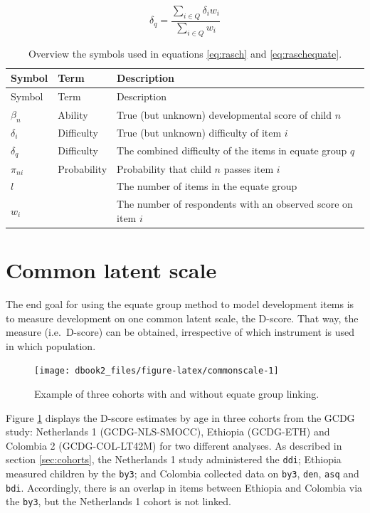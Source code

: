 \documentclass[
]{book}
\begin{document}
\begin{equation}
\delta_q = \frac{\sum_{i\in Q} \delta_iw_i}{\sum_{i\in Q} w_i} \label{eq:raschequate}
\end{equation}

\begin{longtable}[]{@{}lll@{}}
\caption{\label{tab:symbols} Overview the symbols used in equations \eqref{eq:rasch} and \eqref{eq:raschequate}.}\tabularnewline
\toprule
Symbol & Term & Description\tabularnewline
\midrule
\endfirsthead
\toprule
Symbol & Term & Description\tabularnewline
\midrule
\endhead
\(\beta_n\) & Ability & True (but unknown) developmental score of child \(n\)\tabularnewline
\(\delta_i\) & Difficulty & True (but unknown) difficulty of item \(i\)\tabularnewline
\(\delta_q\) & Difficulty & The combined difficulty of the items in equate group \(q\)\tabularnewline
\(\pi_{ni}\) & Probability & Probability that child \(n\) passes item \(i\)\tabularnewline
\(l\) & & The number of items in the equate group\tabularnewline
\(w_i\) & & The number of respondents with an observed score on item \(i\)\tabularnewline
\bottomrule
\end{longtable}

\hypertarget{sec:commonscale}{%
\section{Common latent scale}\label{sec:commonscale}}

The end goal for using the equate group method to model development items is to measure development on one common latent scale, the D-score. That way, the measure (i.e.~D-score) can be obtained, irrespective of which instrument is used in which population.

\begin{figure}

{\centering \texttt{[image: dbook2\_files/figure-latex/commonscale-1]} 

}

\caption{Example of three cohorts with and without equate group linking.}\label{fig:commonscale}
\end{figure}



Figure \ref{fig:commonscale} displays the D-score estimates by age in three cohorts from the GCDG study: Netherlands 1 (GCDG-NLS-SMOCC), Ethiopia (GCDG-ETH) and Colombia 2 (GCDG-COL-LT42M) for two different analyses. As described in section \ref{sec:cohorts}, the Netherlands 1 study administered the \texttt{ddi}; Ethiopia measured children by the \texttt{by3}; and Colombia collected data on \texttt{by3}, \texttt{den}, \texttt{asq} and \texttt{bdi}. Accordingly, there is an overlap in items between Ethiopia and Colombia via the \texttt{by3}, but the Netherlands 1 cohort is not linked.
\end{document}
